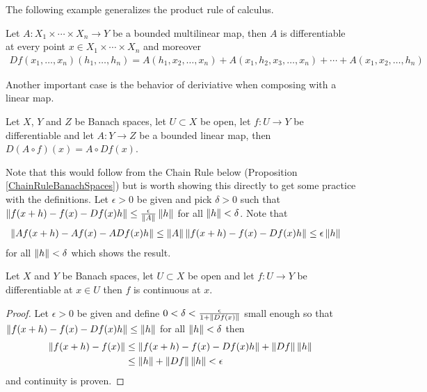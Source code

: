 The following example generalizes the product rule of calculus.
\begin{examp}Let $A : X_1  \times \dotsm \times X_n \to Y$ be a bounded
  multilinear map, then $A$ is differentiable at every point $x \in
  X_1 \times \dotsm \times X_n$
  and moreover 
\begin{align*}
Df(x_1, \dotsc, x_n)(h_1, \dotsc, h_n) = A(h_1, x_2, \dotsc, x_n) +
  A(x_1, h_2, x_3, \dotsc, x_n) + \dotsm + A(x_1, x_2, \dotsc, h_n)
\end{align*}
\end{examp}

Another important case is the behavior of deriviative when composing
with a linear map.
\begin{examp}\label{FrechetDerivativeCompositionWithLinearMap}Let $X$, $Y$ and $Z$ be Banach spaces, let $U \subset X$
  be open, let $f : U \to Y$ be differentiable and let $A : Y \to Z$
  be a bounded linear map, then $D (A \circ f)(x) = A \circ Df(x)$.

Note that this would follow from the Chain Rule below (Proposition
\ref{ChainRuleBanachSpaces}) but is worth showing this directly to get
some practice with the definitions.  Let $\epsilon > 0$ be given and
pick $\delta>0$ such that $\left \lVert f(x+h) - f(x) - Df(x)h \right \rVert \leq
\frac{\epsilon}{\left \lVert A \right \rVert} \left \lVert h \right \rVert$ for all $\left \lVert h \right \rVert < \delta$.  Note
that
\begin{align*}
\left \lVert Af(x+h) - Af(x) - A Df(x)h \right \rVert &\leq \left \lVert A \right \rVert \left \lVert f(x+h) - f(x) -
                                    Df(x)h \right \rVert \leq \epsilon \left \lVert h \right \rVert
\end{align*}
for all $\left \lVert h \right \rVert < \delta$ which shows the result.
\end{examp}

\begin{prop}\label{DifferentiabilityImpliesContinuity}Let $X$ and $Y$ be Banach spaces, let $U \subset X$ be
  open and let $f : U \to Y$ be differentiable at $x \in U$ then $f$
  is continuous at $x$.
\end{prop}
\begin{proof}
Let $\epsilon > 0$ be given and define $0 < \delta < \frac{\epsilon}{1 + \left \lVert Df(x) \right \rVert}$ small enough so
that $\left \lVert f(x+h) - f(x) - Df(x)h \right \rVert \leq \left \lVert h \right \rVert$ for all $\left \lVert h \right \rVert <
\delta$ then 
\begin{align*}
\left \lVert f(x + h) - f(x) \right \rVert &\leq \left \lVert f(x + h) - f(x) - Df(x)h \right \rVert +
                         \left \lVert Df \right \rVert\left \lVert h \right \rVert \\
&\leq \left \lVert h \right \rVert + \left \lVert Df \right \rVert\left \lVert h \right \rVert < \epsilon
\end{align*}
and continuity is proven.
\end{proof}

